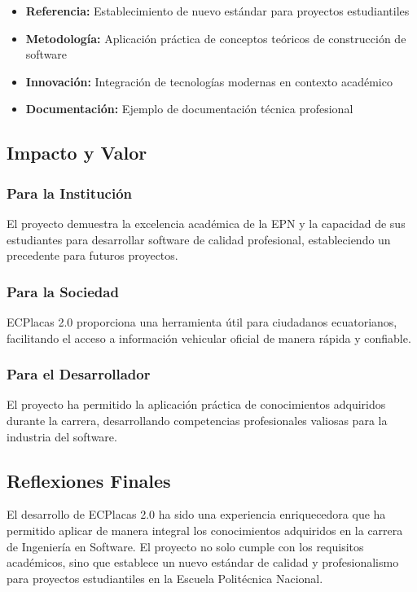 \documentclass[12pt,a4paper]{article}
\begin{document}
\begin{itemize}
    \item \textbf{Referencia:} Establecimiento de nuevo estándar para proyectos estudiantiles
    \item \textbf{Metodología:} Aplicación práctica de conceptos teóricos de construcción de software
    \item \textbf{Innovación:} Integración de tecnologías modernas en contexto académico
    \item \textbf{Documentación:} Ejemplo de documentación técnica profesional
\end{itemize}

\subsection{Impacto y Valor}

\subsubsection{Para la Institución}

El proyecto demuestra la excelencia académica de la EPN y la capacidad de sus estudiantes para desarrollar software de calidad profesional, estableciendo un precedente para futuros proyectos.

\subsubsection{Para la Sociedad}

ECPlacas 2.0 proporciona una herramienta útil para ciudadanos ecuatorianos, facilitando el acceso a información vehicular oficial de manera rápida y confiable.

\subsubsection{Para el Desarrollador}

El proyecto ha permitido la aplicación práctica de conocimientos adquiridos durante la carrera, desarrollando competencias profesionales valiosas para la industria del software.

\subsection{Reflexiones Finales}

El desarrollo de ECPlacas 2.0 ha sido una experiencia enriquecedora que ha permitido aplicar de manera integral los conocimientos adquiridos en la carrera de Ingeniería en Software. El proyecto no solo cumple con los requisitos académicos, sino que establece un nuevo estándar de calidad y profesionalismo para proyectos estudiantiles en la Escuela Politécnica Nacional.
\end{document}

